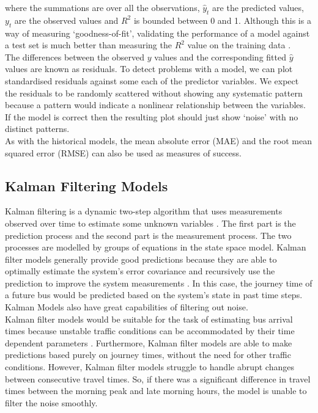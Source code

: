 where the summations are over all the observations, $\hat y_t$ are the predicted values, $y_t$ are the observed values and $R^2$ is bounded between 0 and 1. Although this is a way of measuring `goodness-of-fit', validating the performance of a model against a test set is much better than measuring the $R^2$ value on the training data \cite{forecasting-book}. \\

The differences between the observed $y$ values and the corresponding fitted $\hat y$ values are known as residuals. To detect problems with a model, we can plot standardised residuals against some each of the predictor variables. We expect the residuals to be randomly scattered without showing any systematic pattern because a pattern would indicate a nonlinear relationship between the variables. If the model is correct then the resulting plot should just show `noise' with no distinct patterns. \\

As with the historical models, the mean absolute error (MAE) and the root mean squared error (RMSE) can also be used as measures of success.

\subsection{Kalman Filtering Models}
\label{section:kalman-models-research}

Kalman filtering is a dynamic two-step algorithm that uses measurements observed over time to estimate some unknown variables \cite{kalman-korean}. The first part is the prediction process and the second part is the measurement process. The two processes are modelled by groups of equations in the state space model. Kalman filter models generally provide good predictions because they are able to optimally estimate the system's error covariance and recursively use the prediction to improve the system measurements \cite{kalman-malay}. In this case, the journey time of a future bus would be predicted based on the system's state in past time steps. Kalman Models also have great capabilities of filtering out noise.  \\

Kalman filter models would be suitable for the task of estimating bus arrival times because unstable traffic conditions can be accommodated by their time dependent parameters \cite{dynamic-gps}. Furthermore, Kalman filter models are able to make predictions based purely on journey times, without the need for other traffic conditions. However, Kalman filter models struggle to handle abrupt changes between consecutive travel times. So, if there was a significant difference in travel times between the morning peak and late morning hours, the model is unable to filter the noise smoothly. 

